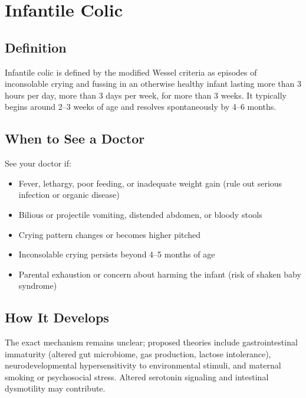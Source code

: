 \chapter{Infantile Colic}

\section*{Definition}
Infantile colic is defined by the modified Wessel criteria as episodes of inconsolable crying and fussing in an otherwise healthy infant lasting more than 3 hours per day, more than 3 days per week, for more than 3 weeks. It typically begins around 2--3 weeks of age and resolves spontaneously by 4--6 months.

\section*{When to See a Doctor}
See your doctor if:
\begin{itemize}
  \item Fever, lethargy, poor feeding, or inadequate weight gain (rule out serious infection or organic disease)
  \item Bilious or projectile vomiting, distended abdomen, or bloody stools
  \item Crying pattern changes or becomes higher pitched
  \item Inconsolable crying persists beyond 4--5 months of age
  \item Parental exhaustion or concern about harming the infant (risk of shaken baby syndrome)
\end{itemize}

\section*{How It Develops}
The exact mechanism remains unclear; proposed theories include gastrointestinal immaturity (altered gut microbiome, gas production, lactose intolerance), neurodevelopmental hypersensitivity to environmental stimuli, and maternal smoking or psychosocial stress. Altered serotonin signaling and intestinal dysmotility may contribute.

